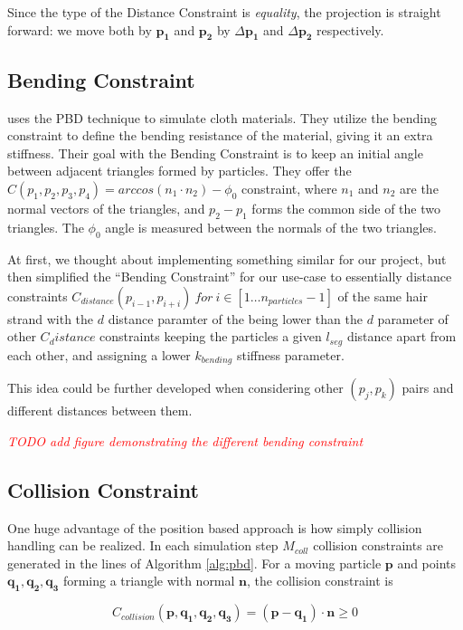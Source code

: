 \documentclass[sigplan,screen,nonacm]{acmart}
\newcommand\TODO[1]{\textcolor{red}{\emph{TODO #1}}}
\renewcommand{\b}{\boldsymbol}
\begin{document}
Since the type of the Distance Constraint is \emph{equality}, the projection is
straight forward: we move both by $\b{p_1}$ and $\b{p_2}$ by $\Delta \b{p_1}$ and
$\Delta \b{p_2}$ respectively.

\subsection{Bending Constraint} \label{section:bendingConstraint}
\citet{UmenhofferSimulation} uses the PBD technique to simulate cloth materials.
They utilize the bending constraint to define the bending resistance of the
material, giving it an extra stiffness. Their goal with the Bending Constraint
is to keep an initial angle between adjacent triangles formed by particles. They
offer the $C(p_1,p_2,p_3,p_4) = arccos(n_1 \cdot n_2) - \phi _0$ constraint,
where $n_1$ and $n_2$ are the normal vectors of the triangles, and $p_2 - p_1$
forms the common side of the two triangles. The $\phi _0$ angle is measured
between the normals of the two triangles.

At first, we thought about implementing something similar for our project, but
then simplified the ``Bending Constraint'' for our use-case to essentially
 distance constraints $C_{distance}(p_{i-1}, p_{i+i})~for~i\in[1 \ldots
n_{particles}-1]$ of the same hair strand with the $d$ distance paramter of the
being lower than the $d$ parameter of other $C_distance$ constraints keeping the
particles a given $l_{seg}$ distance apart from each other, and assigning
a lower $k_{bending}$ stiffness parameter.

This idea could be further developed when considering other $(p_j,p_k)$ pairs
and different distances between them.

\TODO{add figure demonstrating the different bending constraint}

\subsection{Collision Constraint}
One huge advantage of the position based approach is how simply collision
handling can be realized. In each simulation step $M_{coll}$ collision
constraints are generated in the  lines of Algorithm
\ref{alg:pbd}. For a moving particle $\b{p}$ and points $\b{q_1}, \b{q_2},
\b{q_3}$ forming a triangle with normal $\b{n}$, the collision constraint is

$$
C_{collision}(\b{p}, \b{q_1}, \b{q_2}, \b{q_3}) = (\b{p}-\b{q_1})\cdot \b{n} \geq 0
$$
\end{document}

